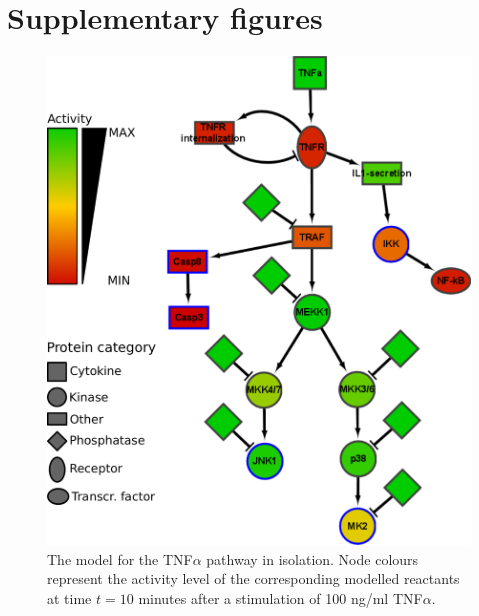 



\clearpage

\section{Supplementary figures}\label{sec:supplementary-figures}


\begin{figure}[htpb]
\begin{minipage}{\textwidth}
\centering
  \includegraphics[width=.7\textwidth]{images/large_network_tnfa2}
\caption{The model for the TNF$\alpha$ pathway in isolation. Node colours represent the activity level of the
corresponding modelled reactants at time $t = 10$ minutes after a stimulation of 100 ng/ml TNF$\alpha$.}\label{fig:large-model-tnf}
\end{minipage}
\end{figure}

